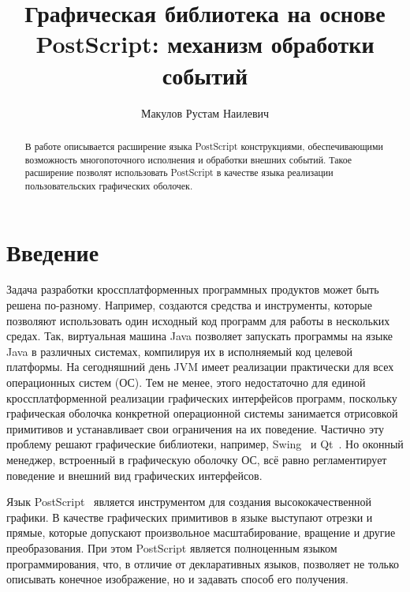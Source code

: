 \title{Графическая библиотека на основе PostScript: механизм обработки событий}


\author{Макулов Рустам Наилевич}



\maketitle             

\begin{abstract}
В работе описывается расширение языка PostScript конструкциями,
обеспечивающими возможность многопоточного исполнения и
обработки внешних событий. Такое расширение позволят использовать
PostScript в качестве языка реализации пользовательских графических
оболочек.
\end{abstract}

\section*{Введение}
Задача разработки кроссплатформенных программных продуктов может быть решена по-разному. Например, создаются средства и инструменты, которые позволяют использовать один исходный код программ для работы в нескольких средах. Так, виртуальная машина Java позволяет запускать программы на языке Java в различных системах, компилируя их в исполняемый код целевой платформы. На сегодняшний день JVM имеет реализации практически для всех операционных систем (ОС). Тем не менее, этого недостаточно для единой кроссплатформенной реализации графических интерфейсов программ, поскольку графическая оболочка конкретной операционной системы занимается отрисовкой примитивов и устанавливает свои ограничения на их поведение. Частично эту проблему решают графические библиотеки, например, Swing~\cite{wiki:swing} и Qt~\cite{wiki:qt}. Но оконный менеджер, встроенный в графическую оболочку ОС, всё равно регламентирует поведение и внешний вид графических интерфейсов.

Язык PostScript~\cite{wiki:plrm} является инструментом для создания высококачественной графики. В качестве графических примитивов в языке выступают отрезки и прямые, которые допускают произвольное масштабирование, вращение и другие преобразования. При этом PostScript является полноценным языком программирования, что, в отличие от декларативных языков, позволяет не только описывать конечное изображение, но и задавать способ его получения.

